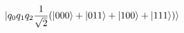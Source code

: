 \documentclass[preview]{standalone}
\begin{document}
\begin{align*}
\ket{q_0 q_1 q_2\frac{1}{\sqrt{2}}(\ket{000} + \ket{011}+\ket{100} +\ket{111})}
\end{align*}
\end{document}
